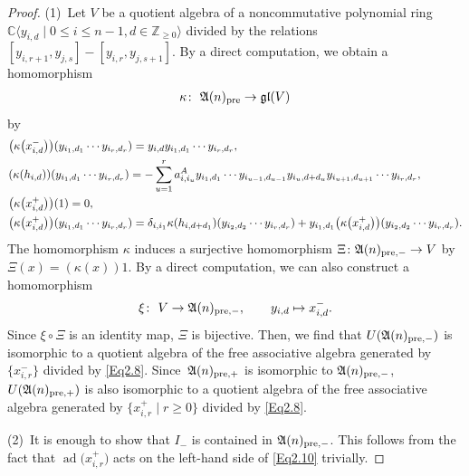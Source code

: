 \documentclass[10pt,a4paper]{amsart}
\numberwithin{equation}{section}
\theoremstyle{definition}
\DeclareMathOperator{\ad}{ad}
\begin{document}
\begin{proof} %
\textup{(1)}\ Let $V$ be a quotient algebra of a noncommutative polynomial ring $\mathbb{C}\langle y_{i,d}\mid0\leq i\leq n-1,d\in\mathbb{Z}_{\geq0}\rangle$ divided by the relations $[y_{i,r+1},y_{j,s}]-[y_{i,r},y_{j,s+1}]$. By a direct computation, we obtain a homomorphism
\begin{align*}
\kappa\colon\ \mathfrak{A}(n)_{{\rm pre}}\to\mathfrak{gl}(V)
\end{align*}
by
\begin{align*}
\begin{split}
&\bigl(\kappa\bigl(x^-_{i,d}\bigr)\bigr)(y_{i_1,d_1}\cdots y_{i_r,d_r})=y_{i,d}y_{i_1,d_1}\cdots y_{i_r,d_r},\\
&(\kappa(h_{i,d}))(y_{i_1,d_1}\cdots y_{i_r,d_r})=-\sum_{u=1}^r\limits a^A_{i,i_u}y_{i_1,d_1}\cdots y_{i_{u-1},d_{u-1}}y_{i_u,d+d_u}y_{i_{u+1},d_{u+1}}\cdots y_{i_r,d_r},\\
&\bigl(\kappa\bigl(x^+_{i,d}\bigr)\bigr)(1)=0,\\
&\bigl(\kappa\bigl(x^+_{i,d}\bigr)\bigr)(y_{i_1,d_1}\cdots y_{i_r,d_r})=\delta_{i,i_1}\kappa(h_{i,d+d_1})(y_{i_2,d_2}\cdots y_{i_r,d_r})+y_{i_1,d_1}\bigl(\kappa\bigl(x^+_{i,d}\bigr)\bigr)(y_{i_2,d_2}\cdots y_{i_r,d_r}).
\end{split}
\end{align*}
The homomorphism $\kappa$ induces a surjective homomorphism $\Xi\colon \mathfrak{A}(n)_{{\rm pre},-}\to V$ by $\Xi(x)=(\kappa(x))1$.
By a direct computation, we can also construct a homomorphism
\begin{align*}
\xi\colon\ V\to \mathfrak{A}(n)_{{\rm pre},-},\qquad y_{i,d}\mapsto x^-_{i,d}.
\end{align*}
Since $\xi\circ\Xi$ is an identity map, $\Xi$ is bijective. Then, we find that $U(\mathfrak{A}(n)_{{\rm pre},-})$ is isomorphic to a quotient algebra of the free associative algebra generated by $\{x^-_{i,r}\}$ divided by \eqref{Eq2.8}. Since~$\mathfrak{A}(n)_{{\rm pre},+}$ is isomorphic to $\mathfrak{A}(n)_{{\rm pre},-}$, $U(\mathfrak{A}(n)_{{\rm pre},+})$ is also isomorphic to a quotient algebra of the free associative algebra generated by $\bigl\{x^+_{i,r}\mid r\geq0\bigr\}$ divided by \eqref{Eq2.8}.

\textup{(2)}\ It is enough to show that $I_-$ is contained in $\mathfrak{A}(n)_{{\rm pre},-}$. This follows from the fact that $\ad\bigl(x^+_{i,r}\bigr)$ acts on the left-hand side of \eqref{Eq2.10} trivially.
\end{proof}
\end{document}
